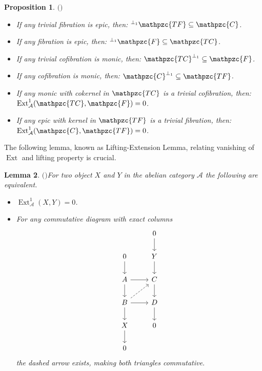 \documentclass[12pt]{amsart}
\numberwithin{equation}{section}
\newtheorem{lemma}{Lemma}[section]
\newtheorem{proposition}[lemma]{Proposition}
\theoremstyle{definition}
\DeclareMathOperator{\Ext}{Ext}
\newtheorem*{theorem 0*}{Theorem}
\newtheorem*{theorem a*}{Theorem A}
\newtheorem*{theorem b*}{Theorem B}
\newcounter{diagram}
\numberwithin{diagram}{section}
\begin{document}
	\begin{proposition}$($\cite[VIII, Lemma 3.2]{BR}$)$\label{2.11}
	\begin{itemize}
	\item[(1)]
	If any trivial fibration is epic, then: $^{\perp_1}\mathpzc{TF}\subseteq\mathpzc{C}$.
	\item[(2)]
	If any fibration is epic, then: $^{\perp_1}\mathpzc{F}\subseteq \mathpzc{TC}$.
	\item[(3)]
	If any trivial cofibration is monic, then: $\mathpzc{TC}^{\perp_1}\subseteq\mathpzc{F}$.
	\item[(4)]
	If any cofibration is monic, then: $\mathpzc{C}^{\perp_1}\subseteq\mathpzc{TF}$.
	\item[(5)]
	If any monic with cokernel in $\mathpzc{TC}$ is a trivial cofibration, then: $\Ext_{\mathcal{A}}^1(\mathpzc{TC},\mathpzc{F})=0$.
	\item[(6)]
	If any epic with kernel in $\mathpzc{TF}$ is a trivial fibration, then: $\Ext_{\mathcal{A}}^1(\mathpzc{C},\mathpzc{TF})=0$.
	\end{itemize}
	\end{proposition}

   The following lemma, known as Lifting-Extension Lemma, relating vanishing of $\Ext$ and lifting property is crucial.
	
	\begin{lemma}$($\cite[VII, Lemma 3.1]{BR}$)$\label{2.12}
	For two object $X$ and $Y$ in the abelian category $\mathcal{A}$ the following are equivalent.
	\begin{itemize}
	\item[(1)]
	$\Ext_{\mathcal{A}}^1(X,Y)=0$.
	\item[(2)]
	For any commutative diagram with exact columns
	\[\begin{tikzcd}
	& 0 \\
	0 & Y \\
	A & C \\
	B & D \\
	X & 0 \\
	0
	\arrow[from=1-2, to=2-2]
	\arrow[from=2-1, to=3-1]
	\arrow[from=2-2, to=3-2]
	\arrow[from=3-1, to=3-2]
	\arrow[from=3-1, to=4-1]
	\arrow[from=3-2, to=4-2]
	\arrow[dashed, from=4-1, to=3-2]
	\arrow[from=4-1, to=4-2]
	\arrow[from=4-1, to=5-1]
	\arrow[from=4-2, to=5-2]
	\arrow[from=5-1, to=6-1]
\end{tikzcd}\]
the dashed arrow exists, making both triangles commutative.
	\end{itemize}
	\end{lemma}
	
\end{document}
